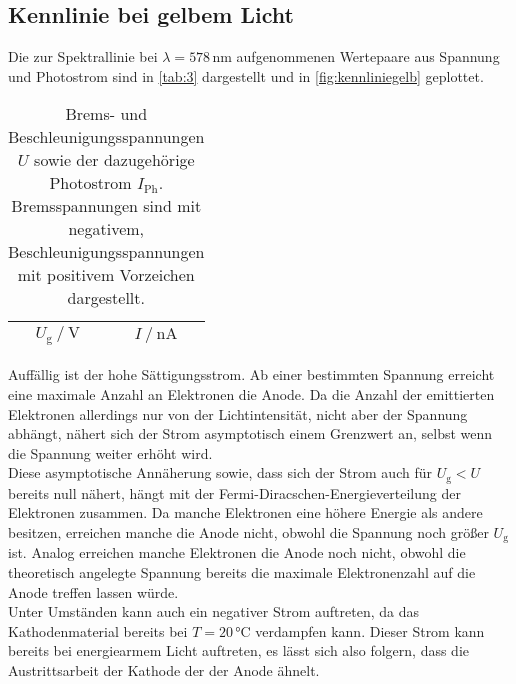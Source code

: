 \subsection{Kennlinie bei gelbem Licht}

Die zur Spektrallinie bei $\lambda = 578 \,\si{\nano\meter}$ aufgenommenen Wertepaare aus Spannung und Photostrom sind in \autoref{tab:3} dargestellt und in \autoref{fig:kennliniegelb} geplottet.

\begin{table}[H]
    \centering
    \caption{Brems- und Beschleunigungsspannungen $U$ sowie der dazugehörige Photostrom $I_\text{Ph}$. Bremsspannungen sind mit negativem, Beschleunigungsspannungen mit positivem Vorzeichen dargestellt.}
    \label{tab:3}
    \begin{tabular}{S S}
      \toprule
      $U_\text{g} \mathbin{/} \si{\volt}$ & $I \mathbin{/} \si{\nano\ampere}$  \\
      \midrule


      \bottomrule
    \end{tabular}
\end{table}


Auffällig ist der hohe Sättigungsstrom.
Ab einer bestimmten Spannung erreicht eine maximale Anzahl an Elektronen die Anode.
Da die Anzahl der emittierten Elektronen allerdings nur von der Lichtintensität, nicht aber der Spannung abhängt, nähert sich der Strom asymptotisch einem Grenzwert an, selbst wenn die Spannung weiter erhöht wird. \\

Diese asymptotische Annäherung sowie, dass sich der Strom auch für $U_\text{g} < U$ bereits null nähert, hängt mit der Fermi-Diracschen-Energieverteilung der Elektronen zusammen.
Da manche Elektronen eine höhere Energie als andere besitzen, erreichen manche die Anode nicht, obwohl die Spannung noch größer $U_\text{g}$ ist.
Analog erreichen manche Elektronen die Anode noch nicht, obwohl die theoretisch angelegte Spannung bereits die maximale Elektronenzahl auf die Anode treffen lassen würde. \\

Unter Umständen kann auch ein negativer Strom auftreten, da das Kathodenmaterial bereits bei $T = 20 \,\si{\celsius}$ verdampfen kann.
Dieser Strom kann bereits bei energiearmem Licht auftreten, es lässt sich also folgern, dass die Austrittsarbeit der Kathode der der Anode ähnelt.


